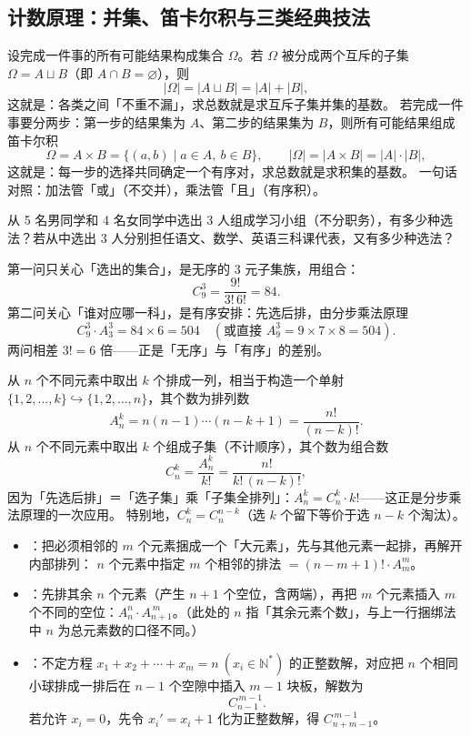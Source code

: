 \begin{explore}

\subsection{计数原理：并集、笛卡尔积与三类经典技法}


设完成一件事的所有可能结果构成集合 $\Omega$。若 $\Omega$ 被分成两个互斥的子集 $\Omega=A\sqcup B$（即 $A\cap B=\varnothing$），则
\[
  |\Omega|=|A\sqcup B|=|A|+|B|,
\]
这就是：各类之间「不重不漏」，求总数就是求互斥子集并集的基数。
若完成一件事要分两步：第一步的结果集为 $A$、第二步的结果集为 $B$，则所有可能结果组成笛卡尔积
\[
  \Omega=A\times B=\{(a,b)\mid a\in A,\ b\in B\},\qquad |\Omega|=|A\times B|=|A|\cdot|B|,
\]
这就是：每一步的选择共同确定一个有序对，求总数就是求积集的基数。
一句话对照：加法管「或」（不交并），乘法管「且」（有序积）。

\begin{example}
从 5 名男同学和 4 名女同学中选出 3 人组成学习小组（不分职务），有多少种选法？若从中选出 3 人分别担任语文、数学、英语三科课代表，又有多少种选法？
\end{example}
\begin{solution}
第一问只关心「选出的集合」，是无序的 $3$ 元子集族，用组合：
\[
  C_9^3=\frac{9!}{3!\,6!}=84 .
\]
第二问关心「谁对应哪一科」，是有序安排：先选后排，由分步乘法原理
\[
  C_9^3\cdot A_3^3=84\times6=504\quad(\text{或直接 }A_9^3=9\times7\times8=504).
\]
两问相差 $3!=6$ 倍——正是「无序」与「有序」的差别。
\end{solution}

从 $n$ 个不同元素中取出 $k$ 个排成一列，相当于构造一个单射 $\{1,2,\dots,k\}\hookrightarrow\{1,2,\dots,n\}$，其个数为排列数
\[
  A_n^k=n(n-1)\cdots(n-k+1)=\frac{n!}{(n-k)!}.
\]
从 $n$ 个不同元素中取出 $k$ 个组成子集（不计顺序），其个数为组合数
\[
  C_n^k=\frac{A_n^k}{k!}=\frac{n!}{k!\,(n-k)!},
\]
因为「先选后排」＝「选子集」乘「子集全排列」：$A_n^k=C_n^k\cdot k!$——这正是分步乘法原理的一次应用。
特别地，$C_n^k=C_n^{n-k}$（选 $k$ 个留下等价于选 $n-k$ 个淘汰）。

\begin{itemize}
  \item {}：把必须相邻的 $m$ 个元素捆成一个「大元素」，先与其他元素一起排，再解开内部排列：
    $n$ 个元素中指定 $m$ 个相邻的排法 $=(n-m+1)!\cdot A_m^m$。
  \item {}：先排其余 $n$ 个元素（产生 $n+1$ 个空位，含两端），再把 $m$ 个元素插入 $m$ 个不同的空位：$A_n^n\cdot A_{n+1}^{\,m}$。（此处的 $n$ 指「其余元素个数」，与上一行捆绑法中 $n$ 为总元素数的口径不同。）
  \item {}：不定方程 $x_1+x_2+\cdots+x_m=n\ (x_i\in\mathbb N^*)$ 的正整数解，对应把 $n$ 个相同小球排成一排后在 $n-1$ 个空隙中插入 $m-1$ 块板，解数为
    \[
      C_{n-1}^{\,m-1}.
    \]
    若允许 $x_i=0$，先令 $x_i'=x_i+1$ 化为正整数解，得 $C_{n+m-1}^{\,m-1}$。
\end{itemize}


\end{explore}
